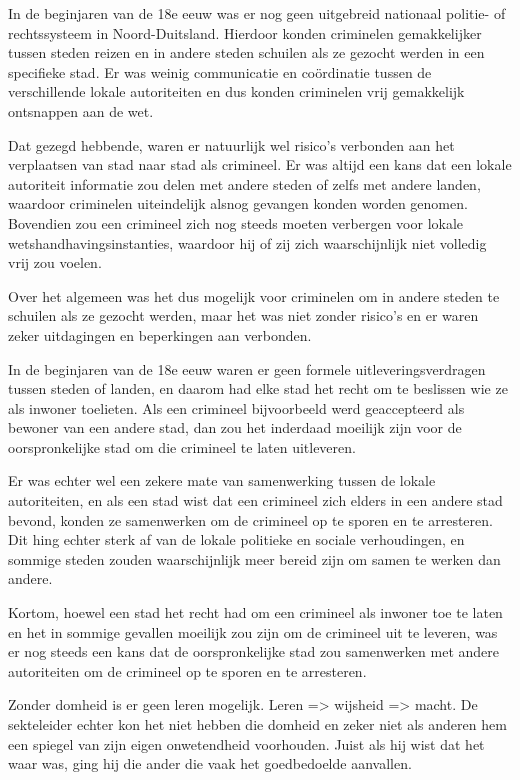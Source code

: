 In de beginjaren van de 18e eeuw was er nog geen uitgebreid nationaal politie- of rechtssysteem in Noord-Duitsland. Hierdoor konden criminelen gemakkelijker tussen steden reizen en in andere steden schuilen als ze gezocht werden in een specifieke stad. Er was weinig communicatie en coördinatie tussen de verschillende lokale autoriteiten en dus konden criminelen vrij gemakkelijk ontsnappen aan de wet.

Dat gezegd hebbende, waren er natuurlijk wel risico's verbonden aan het verplaatsen van stad naar stad als crimineel. Er was altijd een kans dat een lokale autoriteit informatie zou delen met andere steden of zelfs met andere landen, waardoor criminelen uiteindelijk alsnog gevangen konden worden genomen. Bovendien zou een crimineel zich nog steeds moeten verbergen voor lokale wetshandhavingsinstanties, waardoor hij of zij zich waarschijnlijk niet volledig vrij zou voelen.

Over het algemeen was het dus mogelijk voor criminelen om in andere steden te schuilen als ze gezocht werden, maar het was niet zonder risico's en er waren zeker uitdagingen en beperkingen aan verbonden.

In de beginjaren van de 18e eeuw waren er geen formele uitleveringsverdragen tussen steden of landen, en daarom had elke stad het recht om te beslissen wie ze als inwoner toelieten. Als een crimineel bijvoorbeeld werd geaccepteerd als bewoner van een andere stad, dan zou het inderdaad moeilijk zijn voor de oorspronkelijke stad om die crimineel te laten uitleveren.

Er was echter wel een zekere mate van samenwerking tussen de lokale autoriteiten, en als een stad wist dat een crimineel zich elders in een andere stad bevond, konden ze samenwerken om de crimineel op te sporen en te arresteren. Dit hing echter sterk af van de lokale politieke en sociale verhoudingen, en sommige steden zouden waarschijnlijk meer bereid zijn om samen te werken dan andere.

Kortom, hoewel een stad het recht had om een crimineel als inwoner toe te laten en het in sommige gevallen moeilijk zou zijn om de crimineel uit te leveren, was er nog steeds een kans dat de oorspronkelijke stad zou samenwerken met andere autoriteiten om de crimineel op te sporen en te arresteren.

Zonder domheid is er geen leren mogelijk. Leren => wijsheid => macht.
De sekteleider echter kon het niet hebben die domheid en zeker niet als anderen hem een spiegel van zijn eigen onwetendheid voorhouden. Juist als hij wist dat het waar was, ging hij die ander die vaak het goedbedoelde aanvallen.

